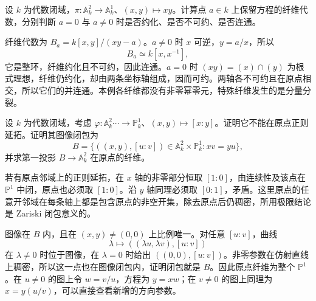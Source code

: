 \begin{exercise}\label{g5:ex:hyperbola-family}
	设 \(k\) 为代数闭域，\(\pi:\mathbb A_k^2\rightarrow\mathbb A_k^1\)、\((x,y)\mapsto xy\)。计算点 \(a\in k\) 上保留方程的纤维代数，分别判断 \(a=0\) 与 \(a\ne0\) 时是否约化、是否不可约、是否连通。
\end{exercise}
\begin{solution}
	纤维代数为 \(B_a=k[x,y]/(xy-a)\)。\(a\ne0\) 时 \(x\) 可逆，\(y=a/x\)，所以
	\[
		B_a\simeq k[x,x^{-1}],
	\]
	它是整环，纤维约化且不可约，因此连通。\(a=0\) 时 \((xy)=(x)\cap(y)\) 为根式理想，纤维仍约化，却由两条坐标轴组成，因而可约。两轴各不可约且在原点相交，所以它们的并连通。本例各纤维都没有非零幂零元，特殊纤维发生的是分量分裂。
\end{solution}

\begin{exercise}\label{g5:ex:direction-map-graph}
	设 \(k\) 为代数闭域，考虑 \(\varphi:\mathbb A_k^2\mathrel{\cdots\!\rightarrow}\mathbb P_k^1\)、\((x,y)\mapsto[x:y]\)。证明它不能在原点正则延拓。证明其图像闭包为
	\[
		B=\{((x,y),[u:v])\in\mathbb A_k^2\times\mathbb P_k^1:xv=yu\},
	\]
	并求第一投影 \(B\rightarrow\mathbb A_k^2\) 在原点的纤维。
\end{exercise}
\begin{solution}
	若有原点邻域上的正则延拓，在 \(x\) 轴的非零部分恒取 \([1:0]\)，由连续性及该点在 \(\mathbb P^1\) 中闭，原点也必须取 \([1:0]\)。沿 \(y\) 轴同理必须取 \([0:1]\)，矛盾。这里原点的任意开邻域在每条轴上都是包含原点的非空开集，除去原点后仍稠密，所用极限结论是 Zariski 闭包意义的。

	图像在 \(B\) 内，且在 \((x,y)\ne(0,0)\) 上比例唯一。对任意 \([u:v]\)，曲线
	\[
		\lambda\longmapsto((\lambda u,\lambda v),[u:v])
	\]
	在 \(\lambda\ne0\) 时位于图像，在 \(\lambda=0\) 时给出 \(((0,0),[u:v])\)。非零参数在仿射直线上稠密，所以这一点也在图像闭包内，证明闭包就是 \(B\)。因此原点纤维为整个 \(\mathbb P^1\)。在 \(u\ne0\) 的图上令 \(w=v/u\)，方程为 \(y=xw\)；在 \(v\ne0\) 的图上同理为 \(x=y(u/v)\)，可以直接查看新增的方向参数。
\end{solution}

